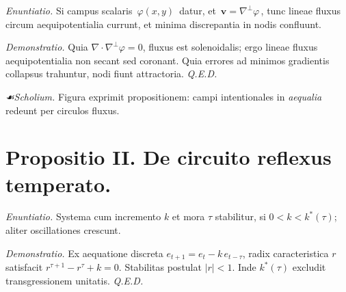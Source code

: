 \documentclass[12pt]{article}
\newcommand{\scholia}{\textit{☙\;}}
\begin{document}
\textit{Enuntiatio.} \; Si campus scalaris $\,\varphi(x,y)\,$ datur, et \,$\mathbf{v}=\nabla^\perp \varphi\,$, tunc lineae fluxus circum aequipotentialia currunt, et minima discrepantia in nodis confluunt.

\textit{Demonstratio.} Quia $\nabla\cdot\nabla^\perp \varphi=0$, fluxus est solenoidalis; ergo lineae fluxus aequipotentialia non secant sed coronant. Quia errores ad minimos gradientis collapsus trahuntur, nodi fiunt attractoria. \textit{Q.E.D.}

\begin{center}
\end{center}

\textit{\scholia Scholium.} Figura exprimit propositionem: campi intentionales in \textit{aequalia} redeunt per circulos fluxus.

\section*{Propositio II. \; De circuito reflexus temperato.}

\textit{Enuntiatio.} \; Systema cum incremento $k$ et mora $\tau$ stabilitur, si \;$0<k<k^\ast(\tau)$; aliter oscillationes crescunt.

\textit{Demonstratio.} Ex aequatione discreta $e_{t+1}=e_t - k\,e_{t-\tau}$, radix caracteristica $r$ satisfacit $r^{\tau+1}-r^\tau+k=0$. Stabilitas postulat $|r|<1$. Inde $k^\ast(\tau)$ excludit transgressionem unitatis. \textit{Q.E.D.}

\begin{center}
\end{center}
\end{document}
